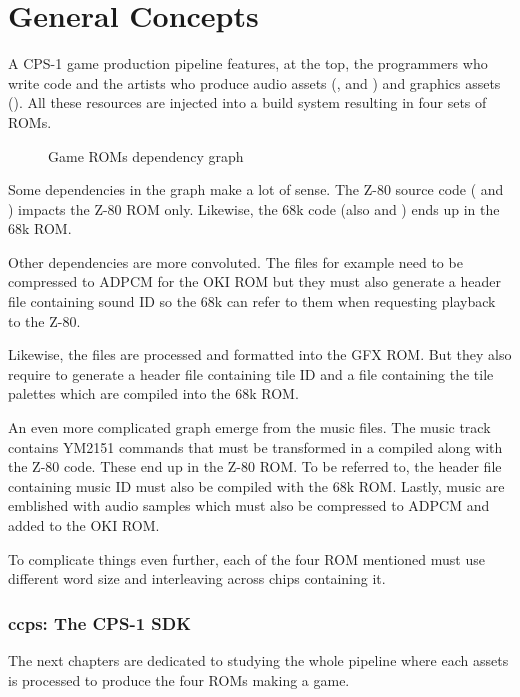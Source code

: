 \chapter{General Concepts}

A CPS-1 game production pipeline features, at the top, the programmers who write code and the artists who produce audio assets (, and ) and graphics assets (). All these resources are injected into a build system resulting in four sets of ROMs. 


 \begin{figure}[H]
\caption*{Game ROMs dependency graph}
\end{figure}

Some dependencies in the graph make a lot of sense. The Z-80 source code ( and ) impacts the Z-80 ROM only. Likewise, the 68k code (also  and ) ends up in the 68k ROM.

Other dependencies are more convoluted. The  files for example need to be compressed to ADPCM for the OKI ROM but they must also generate a  header file containing sound ID so the 68k can refer to them when requesting playback to the Z-80.

Likewise, the  files are processed and formatted into the GFX ROM. But they also require to generate a  header file containing tile ID and a  file containing the tile palettes which are compiled into the 68k ROM. 

An even more complicated graph emerge from the music  files. The music track contains YM2151 commands that must be transformed in a  compiled along with the Z-80 code. These end up in the Z-80 ROM. To be referred to, the header file containing music ID must also be compiled with the 68k ROM. Lastly, music are emblished with audio samples which must also be compressed to ADPCM and added to the OKI ROM.

To complicate things even further, each of the four ROM mentioned must use different word size and interleaving across chips containing it.

\subsection{ccps: The CPS-1 SDK}
The next chapters are dedicated to studying the whole pipeline where each assets is processed to produce the four ROMs making a game. 

